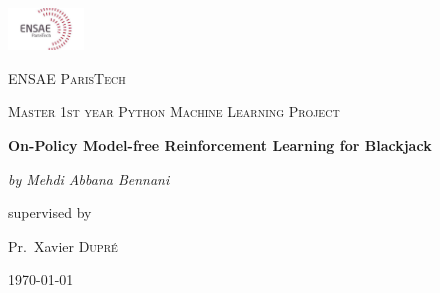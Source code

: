 \documentclass[12pt,a4paper]{article}
\begin{document}

\begin{titlepage}
	\centering
	\includegraphics[width=0.15\textwidth]{ensae.jpg}\par\vspace{1cm}
	{\scshape\LARGE ENSAE ParisTech\par}
	\vspace{1cm}
	{\scshape\Large Master 1st year Python Machine Learning Project\par}
	\vspace{1.5cm}
	{\huge\bfseries On-Policy Model-free Reinforcement Learning for Blackjack\par}
	\vspace{2cm}
	{\Large\itshape by Mehdi Abbana Bennani\par}
	\vfill
	supervised by\par
	Pr.~Xavier \textsc{Dupré}\par    
	\vfill

	{\large \today\par}
\end{titlepage}



\newpage

\null\vspace{\fill}
\begin{abstract}

Reinforcement Learning is a major Machine Learning class of algorithms. In this report, I will apply some major RL algorithms to a simplified blackjack game, mostly inspired form the Easy21 Assignment by Prof. David Silver at UCL. I will demonstrate through simulations that these algorithms achieve a good performance in this framework, and I will show some limits of these algorithms.

\end{abstract}
\vspace{\fill}

\end{document}

